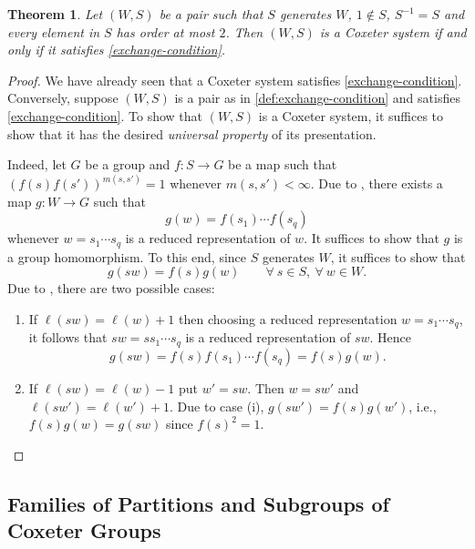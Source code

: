 \documentclass{article}
\theoremstyle{thmstyle}
\newtheorem{theorem}{Theorem}[section]
\theoremstyle{defstyle}
\begin{document}
\begin{theorem}
    Let $(W, S)$ be a pair such that $S$ generates $W$, $1\notin S$, $S^{-1} = S$ and every element in $S$ has order at most $2$. Then $(W, S)$ is a Coxeter system if and only if it satisfies \ref{exchange-condition}.
\end{theorem}
\begin{proof}
    We have already seen that a Coxeter system satisfies \ref{exchange-condition}. Conversely, suppose $(W, S)$ is a pair as in \ref{def:exchange-condition} and satisfies \ref{exchange-condition}. To show that $(W, S)$ is a Coxeter system, it suffices to show that it has the desired \emph{universal property} of its presentation.

    Indeed, let $G$ be a group and $f: S\to G$ be a map such that $\left(f(s)f(s')\right)^{m(s, s')} = 1$ whenever $m(s, s') < \infty$. Due to , there exists a map $g: W\to G$ such that 
    \begin{equation*}
        g(w) = f(s_1)\cdots f(s_q)
    \end{equation*}
    whenever $w = s_1\cdots s_q$ is a reduced representation of $w$. It suffices to show that $g$ is a group homomorphism. To this end, since $S$ generates $W$, it suffices to show that 
    \begin{equation*}
        g(sw) = f(s)g(w)\qquad \forall~s\in S,~\forall~w\in W.
    \end{equation*}
    Due to , there are two possible cases: 
    \begin{enumerate}[label=(\roman*)]
        \item If $\ell(sw) = \ell(w) + 1$ then choosing a reduced representation $w = s_1\cdots s_q$, it follows that $sw = ss_1\cdots s_q$ is a reduced representation of $sw$. Hence 
        \begin{equation*}
            g(sw) = f(s)f(s_1)\cdots f(s_q) = f(s)g(w).
        \end{equation*}

        \item If $\ell(sw) = \ell(w) - 1$ put $w' = sw$. Then $w = sw'$ and $\ell(sw') = \ell(w') + 1$. Due to case (i), $g(sw') = f(s)g(w')$, i.e., $f(s)g(w) = g(sw)$ since $f(s)^2 = 1$. \qedhere
    \end{enumerate}
\end{proof}

\subsection{Families of Partitions and Subgroups of Coxeter Groups}
\end{document}

